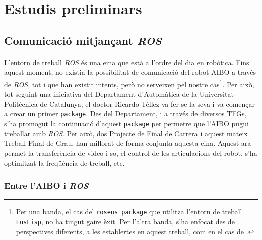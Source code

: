 \documentclass[12pt,a4paper,final,twoside]{article}
\begin{document}
\newpage

\section{Estudis preliminars}
\label{Estudis-preliminars}


\subsection{Comunicació mitjançant \textit{ROS}}
\label{ROS-estudi-pre}


\paragraph{}L'entorn de treball \textit{ROS} és una eina que està a l'ordre del dia en robòtica. Fins aquest moment, no existia la possibilitat de comunicació del robot AIBO a través de \textit{ROS}, tot i que han existit intents, però no serveixen pel nostre cas\footnote{Per una banda, el cas del \texttt{roseus package} \cite{Okada} que utilitza l'entorn de treball \texttt{EusLisp}, no ha tingut gaire èxit. Per l'altra banda, s'ha enfocat des de perspectives diferents, a les establertes en aquest treball, com en el cas de \cite{Rofer2013}.}. Per això, tot seguint una iniciativa del Departament d'Automàtica de la Universitat Politècnica de Catalunya, el doctor Ricardo Téllez va fer-se-la seva i va començar a crear un primer \texttt{package}. Des del Departament, i a través de diversos TFGs, s'ha promogut la continuació d'aquest \texttt{package} per permetre que l'AIBO pugui treballar amb \textit{ROS}. Per això, dos Projecte de Final de Carrera i aquest mateix Treball Final de Grau, han millorat de forma conjunta aquesta eina. Aquest ara permet la transferència de video i so, el control de les articulacions del robot, s'ha optimitzat la freqüència de treball, etc. 


\subsubsection{Entre l'AIBO i \textit{ROS}}
\end{document}
